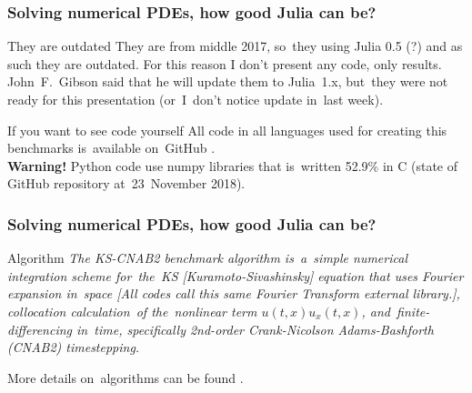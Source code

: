 \documentclass{beamer}  %
\begin{document}
\begin{frame}
  \frametitle{Solving numerical PDEs, how good Julia can be?}

  \begin{block}{They are outdated}
    They are from middle 2017, so~they using Julia 0.5 (?) and as such
    they are outdated. For this reason I don't present any code, only
    results. John~F.~Gibson said that he will update them to
    Julia~1.x, but~they were not ready for this presentation
    (or~I~don't notice update in~last week).
  \end{block}

  \begin{block}{If you want to see code yourself}
    All code in all languages used for creating this benchmarks
    is~available on~GitHub . \\
    \textbf{Warning!} Python code use numpy libraries that is~written
    52.9\% in C (state of GitHub repository at~23~November 2018).
  \end{block}


\end{frame}


\begin{frame}
  \frametitle{Solving numerical PDEs, how good Julia can be?}

  \begin{block}{Algorithm}
    \emph{The KS-CNAB2 benchmark algorithm is~a~simple numerical
      integration scheme for~the~KS [Kuramoto-Sivashinsky] equation
      that uses Fourier expansion in~space [All codes call this same
      Fourier Transform external library.], collocation calculation~of
      the~nonlinear term $u( t, x ) u_{ x }( t, x )$,
      and~finite-differencing in~time, specifically 2nd-order
      Crank-Nicolson Adams-Bashforth
      (CNAB2) timestepping.} \\
  \end{block}

  \begin{block}{}
    More details on~algorithms can be found
    .
  \end{block}

\end{frame}
\end{document}

